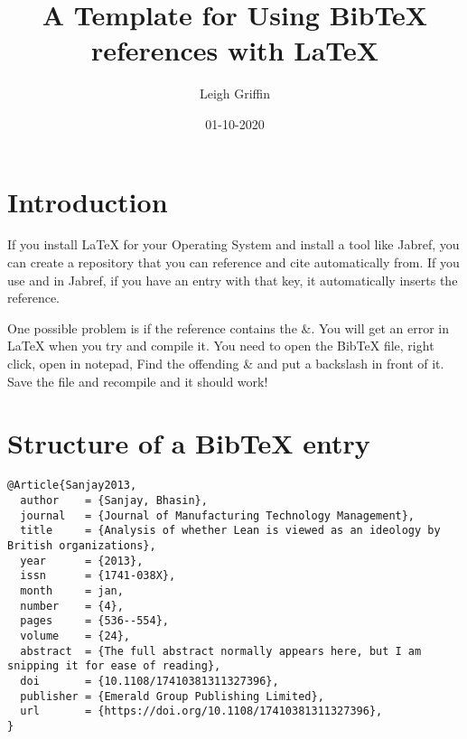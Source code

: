 \documentclass[12pt]{article}
\begin{document}
\title{A Template for Using BibTeX references with LaTeX}
\author{Leigh Griffin}
\date{01-10-2020}

\maketitle

\section{Introduction}
If you install LaTeX for your Operating System and install a tool like Jabref, you can create a repository that you can reference and cite automatically from.
If you use \cite{Sanjay2013} and in Jabref, if you have an entry with that key, it automatically inserts the reference.

One possible problem is if the reference contains the \&. You will get an error in LaTeX when you try and compile it.
You need to open the BibTeX file, right click, open in notepad,
Find the offending \& and put a backslash in front of it. Save the file and recompile and it should work!

\section{Structure of a BibTeX entry}

\begin{lstlisting}
@Article{Sanjay2013,
  author    = {Sanjay, Bhasin},
  journal   = {Journal of Manufacturing Technology Management},
  title     = {Analysis of whether Lean is viewed as an ideology by British organizations},
  year      = {2013},
  issn      = {1741-038X},
  month     = jan,
  number    = {4},
  pages     = {536--554},
  volume    = {24},
  abstract  = {The full abstract normally appears here, but I am snipping it for ease of reading},
  doi       = {10.1108/17410381311327396},
  publisher = {Emerald Group Publishing Limited},
  url       = {https://doi.org/10.1108/17410381311327396},
}

\end{lstlisting}







\end{document}
